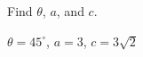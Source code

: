 {Find $\theta$, $a$, and $c$.

\begin{center}
\end{center}}
{$\theta = 45^{\circ}$, $a = 3$, $c = 3\sqrt{2}$}
